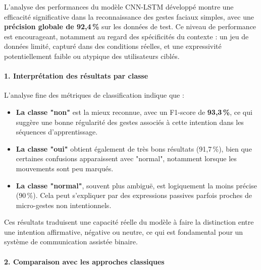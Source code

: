 \documentclass[
]{article}
\begin{document}
L'analyse des performances du modèle CNN-LSTM développé montre une efficacité significative dans la reconnaissance des gestes faciaux simples, avec une \textbf{précision globale de 92,4\,\%} sur les données de test. Ce niveau de performance est encourageant, notamment au regard des spécificités du contexte : un jeu de données limité, capturé dans des conditions réelles, et une expressivité potentiellement faible ou atypique des utilisateurs ciblés.

\hypertarget{interpruxe9tation-des-ruxe9sultats-par-classe}{%
\paragraph{\texorpdfstring{\textbf{1. Interprétation des résultats par classe}}{1. Interprétation des résultats par classe}}\label{interpruxe9tation-des-ruxe9sultats-par-classe}}

L'analyse fine des métriques de classification indique que :

\begin{itemize}
\item
  \textbf{La classe "non"} est la mieux reconnue, avec un F1-score de \textbf{93,3\,\%}, ce qui suggère une bonne régularité des gestes associés à cette intention dans les séquences d'apprentissage.
\item
  \textbf{La classe "oui"} obtient également de très bons résultats (91,7\,\%), bien que certaines confusions apparaissent avec "normal", notamment lorsque les mouvements sont peu marqués.
\item
  \textbf{La classe "normal"}, souvent plus ambiguë, est logiquement la moins précise (90\,\%). Cela peut s'expliquer par des expressions passives parfois proches de micro-gestes non intentionnels.
\end{itemize}

Ces résultats traduisent une capacité réelle du modèle à faire la distinction entre une intention affirmative, négative ou neutre, ce qui est fondamental pour un système de communication assistée binaire.

\hypertarget{comparaison-avec-les-approches-classiques}{%
\paragraph{\texorpdfstring{\textbf{2. Comparaison avec les approches classiques}}{2. Comparaison avec les approches classiques}}\label{comparaison-avec-les-approches-classiques}}
\end{document}
